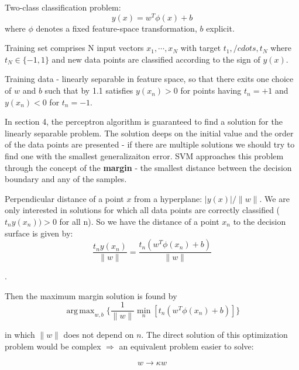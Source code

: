 \documentclass[twoside]{article}
\DeclareMathOperator*{\argmax}{arg\,max}
\begin{document}
Two-class classification problem:
\begin{equation}
y(x) = w^T \phi(x) + b
\end{equation}
where $\phi$ denotes a fixed feature-space transformation, $ b$ explicit.

Training set comprises N input vectors $x_1, \cdots, x_N$ with target $t_1, /cdots, t_N$ where $t_N \in \{-1, 1\}$ and new data points are classified according to the sign of $y(x)$.

Training data - linearly separable in feature space, so  that there exits one choice of $w$ and $b$ such that by 1.1 satisfies $y(x_n)>0$ for points having $t_n=+1$ and $y(x_n)<0$ for $t_n=-1$.

In section 4, the perceptron algorithm is guaranteed to find a solution for the linearly separable problem. The solution deeps on the initial value and the order of the data points are presented - if there are multiple solutions we should try to find one with the smallest generalizaiton error.
SVM approaches this problem through the concept of the \textbf{margin} - the smallest distance between the decision boundary and any of the samples.

Perpendicular distance of a point $x$ from a hyperplane: $ {\lvert y(x) \rvert} / \lVert w \rVert$. We are only interested in solutions for which all data points are correctly classified ($t_n y(x_n)) >0$ for all n). So we have the distance of a point $x_n$ to the decision surface is given by:
\begin{equation}
\frac{t_ny(x_n)}{\lVert w \rVert} = \frac{t_n(w^T \phi(x_n)+b)}{\lVert w \rVert}
\end{equation}

{\color{red}{The margin is given by the perpendicular distance to the closest point $x_n$ from the data set, $w$ and $b$ need optimized in order to maximize the distance}}.

Then the maximum margin solution is found by
\begin{equation}
\argmax_{w, b} \{ \frac{1}{\lVert w \rVert} \min_n[t_n(w^T \phi(x_n)+b)]\}
\end{equation}

in which $\lVert w \rVert$ does not depend on $n$.
The direct solution of this optimization problem would be complex $\Rightarrow$ an equivalent problem easier to solve:

\begin{equation}
w \rightarrow \kappa w
\end{equation}
\end{document}
